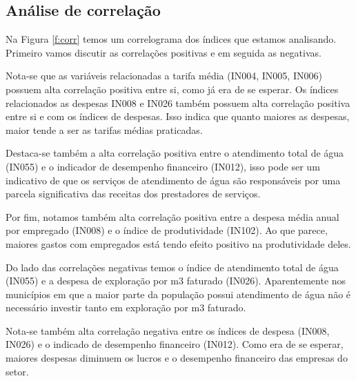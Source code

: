 \begin{multicols}{2}

\subsection{Análise de correlação}

Na Figura \ref{f:corr} temos um correlograma dos índices que estamos analisando. Primeiro vamos discutir as correlações positivas e em seguida as negativas.

Nota-se que as variáveis relacionadas a tarifa média (IN004, IN005, IN006) possuem alta correlação positiva entre si, como já era de se esperar. Os índices relacionados as despesas IN008 e IN026 também possuem alta correlação positiva entre si e com os índices de despesas. Isso indica que quanto maiores as despesas, maior tende a ser as tarifas médias praticadas. 

Destaca-se também a alta correlação positiva entre o atendimento total de água (IN055) e o indicador de desempenho financeiro (IN012), isso pode ser um indicativo de que os serviços de atendimento de água são responsáveis por uma parcela significativa das receitas dos prestadores de serviços. 

Por fim, notamos também alta correlação positiva entre a despesa média anual por empregado (IN008) e o índice de produtividade (IN102). Ao que parece, maiores gastos com empregados está tendo efeito positivo na produtividade deles.

Do lado das correlações negativas temos o índice de atendimento total de água (IN055) e a despesa de exploração por m3 faturado (IN026). Aparentemente nos municípios em que a maior parte da população possui atendimento de água não é necessário investir tanto em exploração por m3 faturado.

Nota-se também alta correlação negativa entre os índices de despesa (IN008, IN026) e o indicado de desempenho financeiro (IN012). Como era de se esperar, maiores despesas diminuem os lucros e o desempenho financeiro das empresas do setor.


\end{multicols}



